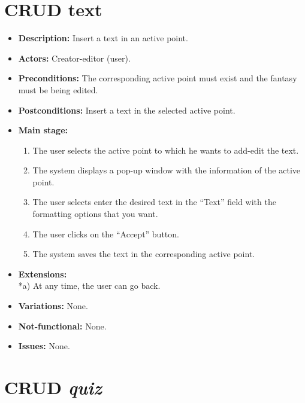 \section{CRUD text}
\begin{itemize}
	\item \textbf{Description:} Insert a text in an active point.
	\item \textbf{Actors:} Creator-editor (user).
	\item \textbf{Preconditions:} The corresponding active point must exist and the fantasy must be being edited.
	\item \textbf{Postconditions:} Insert a text in the selected active point.
	\item \textbf{Main stage:}
	\begin{enumerate}
		\item The user selects the active point to which he wants to add-edit the text.
		\item The system displays a pop-up window with the information of the active point.
		\item The user selects enter the desired text in the ``Text'' field with the formatting options that you want.
		\item The user clicks on the ``Accept'' button.
		\item The system saves the text in the corresponding active point.
	\end{enumerate}
	\item \textbf{Extensions:} \\ *a) At any time, the user can go back.
	\item \textbf{Variations:} None.
	\item \textbf{Not-functional:} None.
	\item \textbf{Issues:} None.
\end{itemize}

\section{CRUD \textit{quiz}}
\hypertarget{crearquiz}{}
